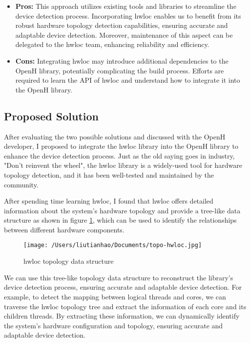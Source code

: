 \documentclass[13pt]{article}
\begin{document}
\begin{itemize}
    \item \textbf{Pros:}
    This approach utilizes existing tools and libraries to streamline the device detection process. 
    Incorporating hwloc enables us to benefit from its robust hardware topology detection capabilities, ensuring accurate and adaptable device detection. 
    Moreover, maintenance of this aspect can be delegated to the hwloc team, enhancing reliability and efficiency.

    \item \textbf{Cons:}
    Integrating hwloc may introduce additional dependencies to the OpenH library, potentially complicating the build process. 
    Efforts are required to learn the API of hwloc and understand how to integrate it into the OpenH library.
\end{itemize}

\subsection{Proposed Solution}
After evaluating the two possible solutions and discussed with the OpenH developer, I proposed to integrate the hwloc library into the OpenH library to enhance the device detection process.
Just as the old saying goes in industry, "Don't reinvent the wheel", the hwloc library is a widely-used tool for hardware topology detection, and it has been well-tested and maintained by the community.

After spending time learning hwloc, I found that hwloc offers detailed information about the system's hardware topology and provide a tree-like data structure as shown in figure \ref{fig:hwloc}, which can be used to identify the relationships between different hardware components. 

\begin{figure}[h!]
    \centering
    \texttt{[image: /Users/liutianhao/Documents/topo-hwloc.jpg]}
    \caption{hwloc topology data structure}
    \label{fig:hwloc}
\end{figure}

We can use this tree-like topology data structure to reconstruct the library's device detection process, ensuring accurate and adaptable device detection.
For example, to detect the mapping between logical threads and cores, we can traverse the hwloc topology tree and extract the information of each core and its children threads.
By extracting these information, we can dynamically identify the system's hardware configuration and topology, ensuring accurate and adaptable device detection.
\end{document}
